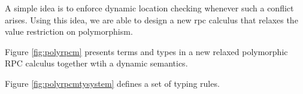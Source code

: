 \documentclass[a4paper]{article}
\theoremstyle{plain}
\theoremstyle{definition}
\begin{document}
%
A simple idea is to enforce dynamic location checking whenever such a
conflict arises.
%
Using this idea, we are able to design a new rpc calculus that relaxes
the value restriction on polymorphism.

%
Figure \ref{fig:polyrpcm} presents terms and types in a new relaxed
polymorphic RPC calculus together wtih a dynamic semantics.

%
Figure \ref{fig:polyrpcmtysystem} defines a set of typing rules.






\end{document}
